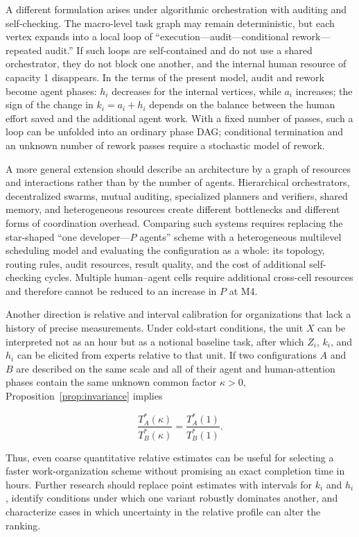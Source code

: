 A different formulation arises under algorithmic orchestration with auditing
and self-checking. The macro-level task graph may remain deterministic, but
each vertex expands into a local loop of ``execution---audit---conditional
rework---repeated audit.'' If such loops are self-contained and do not use a
shared orchestrator, they do not block one another, and the internal human
resource of capacity 1 disappears. In the terms of the present model, audit
and rework become agent phases: $h_i$ decreases for the internal vertices,
while $a_i$ increases; the sign of the change in $k_i=a_i+h_i$ depends on the
balance between the human effort saved and the additional agent work. With a
fixed number of passes, such a loop can be unfolded into an ordinary phase
DAG; conditional termination and an unknown number of rework passes require a
stochastic model of rework.

A more general extension should describe an architecture by a graph of
resources and interactions rather than by the number of agents. Hierarchical
orchestrators, decentralized swarms, mutual auditing, specialized planners and
verifiers, shared memory, and heterogeneous resources create different
bottlenecks and different forms of coordination overhead. Comparing such
systems requires replacing the star-shaped ``one developer---$P$ agents''
scheme with a heterogeneous multilevel scheduling model and evaluating the
configuration as a whole: its topology, routing rules, audit resources, result
quality, and the cost of additional self-checking cycles. Multiple
human--agent cells require additional cross-cell resources and therefore
cannot be reduced to an increase in $P$ at M4.

Another direction is relative and interval calibration for organizations that
lack a history of precise measurements. Under cold-start conditions, the unit
$X$ can be interpreted not as an hour but as a notional baseline task, after
which $Z_i$, $k_i$, and $h_i$ can be elicited from experts relative to that
unit. If two configurations $A$ and $B$ are described on the same scale and all
of their agent and human-attention phases contain the same unknown common
factor $\kappa>0$, Proposition~\ref{prop:invariance} implies

\[
\frac{T_A^*(\kappa)}{T_B^*(\kappa)}=
\frac{T_A^*(1)}{T_B^*(1)}.
\]

Thus, even coarse quantitative relative estimates can be useful for selecting
a faster work-organization scheme without promising an exact completion time
in hours. Further research should replace point estimates with intervals for
$k_i$ and $h_i$, identify conditions under which one variant robustly
dominates another, and characterize cases in which uncertainty in the relative
profile can alter the ranking.

